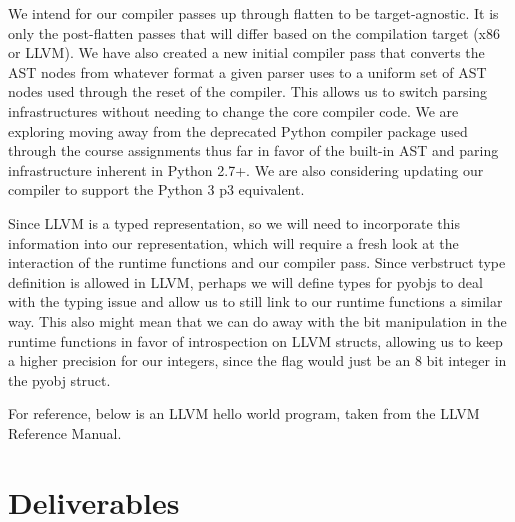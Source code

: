 \documentclass[11pt]{article}
\begin{document}
We intend for our compiler passes up through flatten to be
target-agnostic. It is only the post-flatten passes that will differ
based on the compilation target (x86 or LLVM). We have also created a
new initial compiler pass that converts the AST nodes from whatever
format a given parser uses to a uniform set of AST nodes used through
the reset of the compiler. This allows us to switch parsing
infrastructures without needing to change the core compiler code. We are
exploring moving away from the deprecated Python compiler package used
through the course assignments thus far in
favor of the built-in AST and paring infrastructure inherent in Python
2.7+. We are also considering updating our compiler to support the
Python 3 p3 equivalent.

Since LLVM is a typed representation, so we will need to incorporate
this information into our representation, which will require a fresh
look at the interaction of the runtime functions and our compiler
pass. Since verb{struct} type definition is allowed in LLVM, perhaps
we will define types for pyobjs to deal with the typing issue and
allow us to still link to our runtime functions a similar way.  This
also might mean that we can do away with the bit manipulation in the
runtime functions in favor of introspection on LLVM structs, allowing
us to keep a higher precision for our integers, since the flag would
just be an 8 bit integer in the pyobj struct.

For reference, below is an LLVM hello world program, taken from the
LLVM Reference Manual.



\section{Deliverables}




\nocite{*} 

\end{document}
